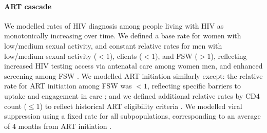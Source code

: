 \paragraph{ART cascade}
We modelled rates of HIV diagnosis among people living with HIV as monotonically increasing over time.
We defined a base rate for women with low/medium sexual activity,
and constant relative rates for
men with low/medium sexual activity ($<1$), clients ($<1$), and FSW ($>1$),
reflecting increased HIV testing access via antenatal care among women \vs men,
and enhanced screening among FSW \cite{Baral2014}.
We modelled ART initiation similarly except:
the relative rate for ART initiation among FSW was $<1$,
reflecting specific barriers to uptake and engagement in care \cite{Mountain2014sr}; and
we defined additional relative rates by CD4 count ($\le1$)
to reflect historical ART eligibility criteria \cite{NERCHA2018rep}.
We modelled viral suppression using a fixed rate for all subpopulations,
corresponding to an average of 4 months from ART initiation \cite{Mujugira2016}.
